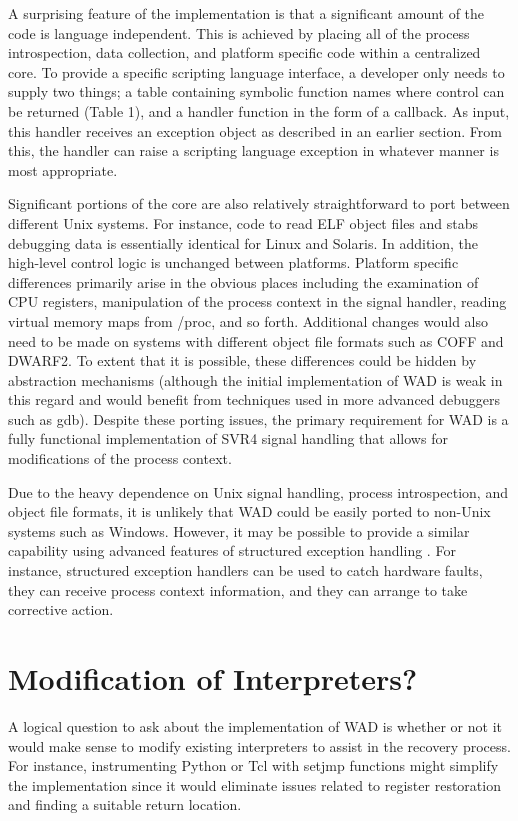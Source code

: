 A surprising feature of the implementation is that a significant
amount of the code is language independent.  This is achieved by
placing all of the process introspection, data collection, and
platform specific code within a centralized core.  To provide a
specific scripting language interface, a developer only needs to
supply two things; a table containing symbolic function names where
control can be returned (Table 1), and a handler function in the form
of a callback.  As input, this handler receives an exception object as
described in an earlier section.  From this, the handler can
raise a scripting language exception in whatever manner is most
appropriate.

Significant portions of the core are also relatively straightforward
to port between different Unix systems.  For instance, code to read
ELF object files and stabs debugging data is essentially identical for
Linux and Solaris.  In addition, the high-level control logic is
unchanged between platforms.  Platform specific differences primarily
arise in the obvious places including the examination of CPU
registers, manipulation of the process context in the signal handler,
reading virtual memory maps from /proc, and so forth.  Additional
changes would also need to be made on systems with different object
file formats such as COFF and DWARF2.  To extent that it is possible,
these differences could be hidden by abstraction mechanisms (although
the initial implementation of WAD is weak in this regard and would
benefit from techniques used in more advanced debuggers such as gdb).
Despite these porting issues, the primary requirement for WAD is a fully
functional implementation of SVR4 signal handling that allows for
modifications of the process context.

Due to the heavy dependence on Unix signal handling, process
introspection, and object file formats, it is unlikely that WAD could
be easily ported to non-Unix systems such as Windows.  However, it may
be possible to provide a similar capability using advanced features of
structured exception handling \cite{seh}.  For instance, structured
exception handlers can be used to catch hardware faults, they can
receive process context information, and they can arrange to take
corrective action.  

\section{Modification of Interpreters?}

A logical question to ask about the implementation of WAD is whether
or not it would make sense to modify existing interpreters to assist
in the recovery process. For instance, instrumenting Python or Tcl with setjmp
functions might simplify the implementation since it would eliminate
issues related to register restoration and finding a suitable return
location.

